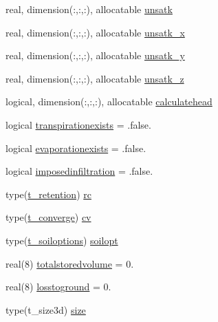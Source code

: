 \begin{DoxyCompactItemize}
real, dimension(\+:,\+:,\+:), allocatable \mbox{\hyperlink{structmoduleporousmedia_1_1t__porousmedia_a2250b873cc9fbd8fcfb0d9b0a3b5843f}{unsatk}}
\item 
real, dimension(\+:,\+:,\+:), allocatable \mbox{\hyperlink{structmoduleporousmedia_1_1t__porousmedia_ae5c23b9a32690cbd2ff63a3915dd9717}{unsatk\+\_\+x}}
\item 
real, dimension(\+:,\+:,\+:), allocatable \mbox{\hyperlink{structmoduleporousmedia_1_1t__porousmedia_a2091bdd8fe5c187252055b2f54db1b23}{unsatk\+\_\+y}}
\item 
real, dimension(\+:,\+:,\+:), allocatable \mbox{\hyperlink{structmoduleporousmedia_1_1t__porousmedia_a648cd82130ce52d123c02ac25545093c}{unsatk\+\_\+z}}
\item 
logical, dimension(\+:,\+:,\+:), allocatable \mbox{\hyperlink{structmoduleporousmedia_1_1t__porousmedia_a7b77746aec22400fa8049169d9793d5a}{calculatehead}}
\item 
logical \mbox{\hyperlink{structmoduleporousmedia_1_1t__porousmedia_a387a5a4e15680b855714b23d7b6820fe}{transpirationexists}} = .false.
\item 
logical \mbox{\hyperlink{structmoduleporousmedia_1_1t__porousmedia_a22aad713988ce4687fd241876b57cf18}{evaporationexists}} = .false.
\item 
logical \mbox{\hyperlink{structmoduleporousmedia_1_1t__porousmedia_afccd465707e99eada3567183ba43f2b9}{imposedinfiltration}} = .false.
\item 
type(\mbox{\hyperlink{structmoduleporousmedia_1_1t__retention}{t\+\_\+retention}}) \mbox{\hyperlink{structmoduleporousmedia_1_1t__porousmedia_a065ccccc186d7dab74fd2003713d5a37}{rc}}
\item 
type(\mbox{\hyperlink{structmoduleporousmedia_1_1t__converge}{t\+\_\+converge}}) \mbox{\hyperlink{structmoduleporousmedia_1_1t__porousmedia_aa3228eff2303f2f982d038dc41a5843d}{cv}}
\item 
type(\mbox{\hyperlink{structmoduleporousmedia_1_1t__soiloptions}{t\+\_\+soiloptions}}) \mbox{\hyperlink{structmoduleporousmedia_1_1t__porousmedia_a26b0e194077348c18d470735ec1b355d}{soilopt}}
\item 
real(8) \mbox{\hyperlink{structmoduleporousmedia_1_1t__porousmedia_a50d7f373f67258ff2da22888dbfb2b82}{totalstoredvolume}} = 0.
\item 
real(8) \mbox{\hyperlink{structmoduleporousmedia_1_1t__porousmedia_a3c97c2b4c0a947a9b4850988692117cb}{losstoground}} = 0.
\item 
type(t\+\_\+size3d) \mbox{\hyperlink{structmoduleporousmedia_1_1t__porousmedia_a63ba7dd4c0a366939c0ed37ea3b5e550}{size}}

\end{DoxyCompactItemize}
